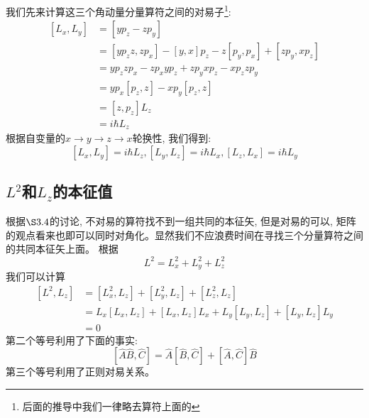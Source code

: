 \documentclass[a4paper,zihao=-4,linespread=1]{ctexrep}
\newenvironment{lequation}{\large\begin{equation}}{\end{equation}}
\begin{document}
    我们先来计算这三个角动量分量算符之间的对易子\footnote{后面的推导中我们一律略去算符上面的$\hat{}$}:
    \begin{align*}
        \left[L_x,L_y\right]&=\left[yp_z-zp_y\right]\\&=\left[yp_zz,zp_x\right]-\left[y,x\right]p_z-z\left[p_y,p_x\right]+\left[zp_y,xp_z\right]
        \\&=yp_zzp_x-zp_xyp_z+zp_yxp_z-xp_zzp_y\\&=yp_x\left[p_z,z\right]-xp_y\left[p_z,z\right]\\&=\left[z,p_z\right]L_z
        \\&=i\hbar L_z
    \end{align*}
    根据自变量的$x\to y\to z\to x$轮换性, 我们得到:
    \begin{lequation}
        \label{eq:4.48}
        \boxed{
            \left[L_x,L_y\right]=i\hbar L_z,\left[L_y,L_z\right]=i\hbar L_x,\left[L_z,L_x\right]=i\hbar L_y
        }
    \end{lequation}

    \subsection*{$L^2$和$L_z$的本征值}
    根据$\S 3.4$的讨论, 不对易的算符找不到一组共同的本征矢, 但是对易的可以, 矩阵的观点看来也即可以同时对角化。显然我们不应浪费时间在寻找三个分量算符之间的共同本征矢上面。
    根据\[L^2=L_x^2+L_y^2+L_z^2\]我们可以计算
    \begin{align*}
        \left[L^2,L_z\right]&=\left[L_x^2,L_z\right]+\left[L_y^2,L_z\right]+\left[L_z^2,L_z\right]
        \\ &=L_x\left[L_x,L_z\right]+\left[L_x,L_z\right]L_x+L_y\left[L_y,L_z\right]+\left[L_y,L_z\right]L_y
        \\ &=0
    \end{align*}
    第二个等号利用了下面的事实:\[\left[\hat{A}\hat{B},\hat{C}\right]=\hat{A}\left[\hat{B},\hat{C}\right]+\left[\hat{A},\hat{C}\right]\hat{B}\]
    第三个等号利用了正则对易关系。
\end{document}

